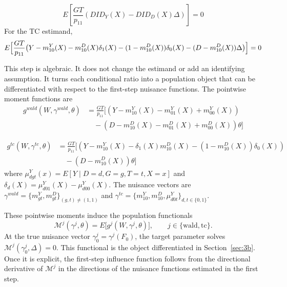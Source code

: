 \begin{equation}\label{eq:3}
    E\left[\frac{GT}{p_{11}}(DID_Y(X)-DID_D(X)\Delta)\right]=0
\end{equation}
For the TC estimand,
 \begin{equation}\label{eq:4}
    E\Bigl[\frac{GT}{p_{11}}\bigl(Y-m^Y_{10}(X)-m^D_{10}(X)\delta_1(X)-(1-m^D_{10}(X))\delta_0(X)-(D-m^D_{10}(X))\Delta\bigr)\Bigr]=0
 \end{equation}

This step is algebraic. It does not change the estimand or add an identifying assumption. It turns each conditional ratio into a population object that can be differentiated with respect to the first-step nuisance functions. The pointwise moment functions are
\begin{equation}
        \begin{aligned}\label{eq:5}
            g^{wald}(W,\gamma^{wald},\theta) &= \frac{GT}{p_{11}}[(Y-m^Y_{10}(X)-m^Y_{01}(X)+m^Y_{00}(X)) \\
                                                             &\quad - (D-m^D_{10}(X)-m^D_{01}(X)+m^D_{00}(X))\theta]
        \end{aligned}
    \end{equation}



    \begin{equation}\label{eq:6}
        \begin{aligned}
            g^{tc}(W,\gamma^{tc},\theta) &= \frac{GT}{p_{11}}[(Y-m^Y_{10}(X)-\delta_1(X)m^D_{10}(X)-(1-m^D_{10}(X))\delta_0(X)) \\
                                                             &\quad - (D-m^D_{10}(X))\theta]
        \end{aligned}
    \end{equation}
where $\mu^Y_{dgt}(x)=E[Y \mid D=d, G=g, T=t, X=x]$ and $\delta_d(X)=\mu^Y_{d01}(X)-\mu^Y_{d00}(X)$. The nuisance vectors are $\gamma^{wald} = \{m^Y_{gt}, m^D_{gt}\}_{(g,t) \neq (1,1)}$ and $\gamma^{tc} = \{m^Y_{10}, m^D_{10}, \mu^Y_{d0t}\}_{d,t \in \{0,1\}}$.

These pointwise moments induce the population functionals
\[
    \mathcal{M}^j(\gamma^j,\theta)
    =
    E\bigl[g^j(W,\gamma^j,\theta)\bigr],
    \qquad j\in\{\text{wald},\text{tc}\}.
\]
At the true nuisance vector $\gamma^j_0=\gamma^j(F_0)$, the target parameter solves $\mathcal{M}^j(\gamma^j_0,\Delta)=0$. This functional is the object differentiated in Section~\ref{sec:3b}. Once it is explicit, the first-step influence function follows from the directional derivative of $\mathcal{M}^j$ in the directions of the nuisance functions estimated in the first step.

